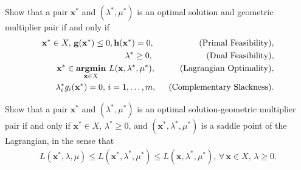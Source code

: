 \documentclass[11pt,letter,notitlepage]{article}
\DeclareMathOperator*{\argmin}{\bf argmin}
\begin{document}
\newpage
\begin{exercise}
	Show that a pair $\mathbf{x}^*$ and $(\lambda^*,\mu^*)$ is an optimal solution and geometric multiplier pair if and only if
	\begin{align}\label{cond:primal-feasibility}
		\mathbf{x}^*\in X,\,\mathbf{g}(\mathbf{x}^*)\leq0,\mathbf{h}(\mathbf{x}^*)=0,\hspace{18.5mm}(\mbox{\textup{Primal Feasibility}}),&\\ \label{cond:dual-feasibility}
		\lambda^*\geq0,\hspace{22mm}(\mbox{\textup{Dual Feasibility}}),&\\ \label{cond:lagrangian-optimality}
		\mathbf{x}^*\in\argmin_{\mathbf{x}\in X}\,L(\mathbf{x},\lambda^*,\mu^*),\hspace{10mm}(\mbox{\textup{Lagrangian Optimality}}),&\\ \label{cond:complementary-slackness}
		\lambda^*_ig_i(\mathbf{x}^*)=0,\,i=1,\ldots,m,\hspace{5mm}(\mbox{\textup{Complementary Slackness}}).&
	\end{align}
\end{exercise}


\newpage
\begin{exercise}
	 Show that a pair $\mathbf{x}^*$ and $(\lambda^*,\mu^*)$ is an optimal solution-geometric multiplier pair if and only if $\mathbf{x}^*\in X$, $\lambda^*\geq0$, and $(\mathbf{x}^*,\lambda^*,\mu^*)$ is a saddle point of the Lagrangian, in the sense that
	\begin{align}\label{cond:saddle-Lagrangian}
		L(\mathbf{x}^*,\lambda,\mu)\leq L(\mathbf{x}^*,\lambda^*,\mu^*)\leq L(\mathbf{x},\lambda^*,\mu^*),\,\forall\,\mathbf{x}\in X,\,\lambda\geq0.
	\end{align}
\end{exercise}
\end{document}
